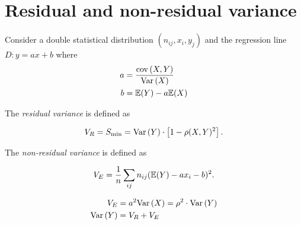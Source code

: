 \documentclass{report}
\begin{document}
\section{Residual and non-residual variance}

Consider a double statistical distribution $(n_{ij},x_i,y_j)$ and the regression line $D: y = ax + b$ where
\begin{align*}
	a & = \frac{\mathrm{cov}\left( X,Y \right)}{\mathrm{Var}\left( X \right)} \\
	b & = \mathbb{E}(Y) - a\mathbb{E}(X)
\end{align*}

The \emph{residual variance} is defined as

\[
	V_R = S_{\min} = \mathrm{Var}\left( Y \right)\cdot\left[ 1 - \rho(X,Y)^2 \right]
	.\]

The \emph{non-residual variance} is defined as

\[
	V_{E} = \frac{1}{n} \sum_{ij} n_{ij}(\mathbb{E}(Y) - ax_i -b)^2
	.\]

\begin{align*}
	V_E     & = a^2\mathrm{Var}\left( X \right) = \rho^2\cdot\mathrm{Var}\left( Y \right) \\
	\mathrm{Var}\left( Y \right) & = V_R + V_E
\end{align*}
\end{document}
